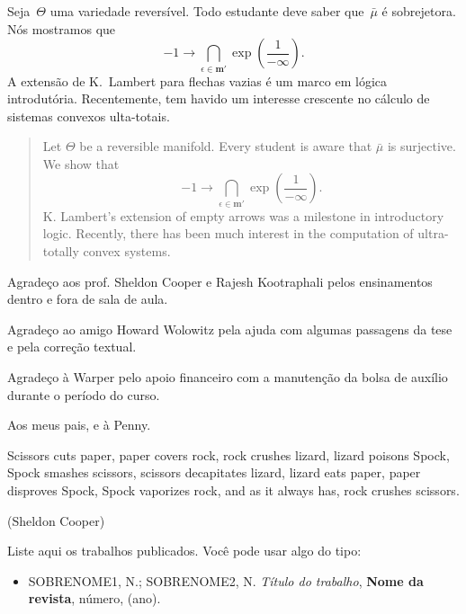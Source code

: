 \documentclass[rascunho]{ufc}
\theoremstyle{plain}
\theoremstyle{definition}
\begin{document}
\maketitle
\begin{resumo}
Seja~$\Theta$ uma variedade reversível. Todo estudante deve saber que~$\bar{\mu}$ é sobrejetora. Nós mostramos que $$-1 \to \bigcap_{\epsilon \in \mathbf{{m}}'}  \exp \left( \frac{1}{-\infty} \right).$$  A extensão de K.~Lambert para flechas vazias é um marco em lógica introdutória. Recentemente, tem havido um interesse crescente no cálculo de sistemas convexos ulta-totais.
\end{resumo}

\begin{abstract}
 Let $\Theta$ be a reversible manifold.  Every student is aware that $\bar{\mu}$ is surjective.  We show that $$-1 \to \bigcap_{\epsilon \in \mathbf{{m}}'}  \exp \left( \frac{1}{-\infty} \right).$$  K. Lambert's extension of empty arrows was a milestone in introductory logic. Recently, there has been much interest in the computation of ultra-totally convex systems.
\end{abstract}

\begin{agradecimentos}
Agradeço aos prof. Sheldon Cooper e Rajesh Kootraphali pelos ensinamentos dentro e fora de sala de aula.

Agradeço ao amigo Howard Wolowitz pela ajuda com algumas passagens da tese e pela correção textual.

Agradeço à Warper pelo apoio financeiro com a manutenção da bolsa de auxílio durante o período do curso.
\end{agradecimentos}

\begin{dedicatoria}
Aos meus pais, e à Penny.
\end{dedicatoria}

\begin{epigrafe}
Scissors cuts paper, paper covers rock, rock crushes lizard, lizard poisons Spock, Spock smashes scissors, scissors decapitates lizard, lizard eats paper, paper disproves Spock, Spock vaporizes rock, and as it always has, rock crushes scissors.\par\textnormal{(Sheldon Cooper)}
\end{epigrafe}

\tableofcontents

\begin{listapublicacoes}
  Liste aqui os trabalhos publicados. Você pode usar algo do tipo:
  \begin{itemize}
    \item SOBRENOME1, N.; SOBRENOME2, N. \emph{Título do trabalho}, \textbf{Nome da revista}, número, (ano). 
  \end{itemize}
\end{listapublicacoes}
\end{document}
